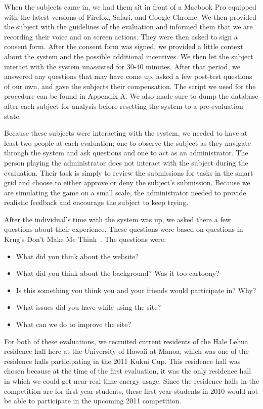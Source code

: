 When the subjects came in, we had them sit in front of a Macbook Pro equipped with the latest versions of Firefox, Safari, and Google Chrome.  We then provided the subject with the guidelines of the evaluation and informed them that we are recording their voice and on screen actions.  They were then asked to sign a consent form. After the consent form was signed, we provided a little context about the system and the possible additional incentives. We then let the subject interact with the system unassisted for 30-40 minutes.  After that period, we answered any questions that may have come up, asked a few post-test questions of our own, and gave the subjects their compensation.  The script we used for the procedure can be found in Appendix A. We also made sure to dump the database after each subject for analysis before resetting the system to a pre-evaluation state.

Because these subjects were interacting with the system, we needed to have at least two people at each evaluation; one to observe the subject as they navigate through the system and ask questions and one to act as an administrator.  The person playing the administrator does not interact with the subject during the evaluation.  Their task is simply to review the submissions for tasks in the smart grid and choose to either approve or deny the subject's submission.  Because we are simulating the game on a small scale, the administrator needed to provide realistic feedback and encourage the subject to keep trying.

After the individual's time with the system was up, we asked them a few questions about their experience. These questions were based on questions in Krug's Don't Make Me Think~\cite{krug-dmmt}. The questions were:

\begin{itemize}
    \item What did you think about the website?
    \item What did you think about the background? Was it too cartoony?
    \item Is this something you think you and your friends would participate in? Why?
    \item What issues did you have while using the site?
    \item What can we do to improve the site?
\end{itemize}

For both of these evaluations, we recruited current residents of the Hale Lehua residence hall here at the University of Hawaii at Manoa, which was one of the residence halls participating in the 2011 Kukui Cup.  This residence hall was chosen because at the time of the first evaluation, it was the only residence hall in which we could get near-real time energy usage.  Since the residence halls in the competition are for first year students, these first-year students in 2010 would not be able to participate in the upcoming 2011 competition.

